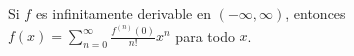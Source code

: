 \item Si $f$ es infinitamente derivable en $(-\infty, \infty)$, entonces $f(x) = \displaystyle\sum_{n=0}^\infty \frac{f^{(n)}(0)}{n!}x^n$ para todo $x$.
